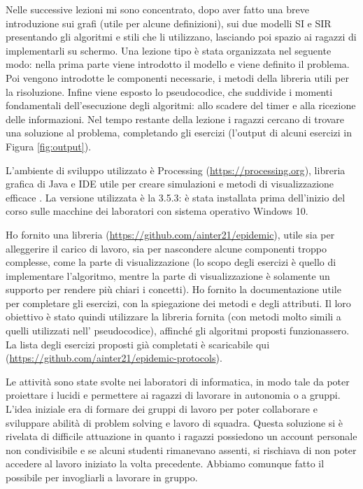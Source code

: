 Nelle successive lezioni mi sono concentrato, dopo aver fatto una breve introduzione sui grafi (utile per alcune definizioni), sui due modelli SI e SIR presentando gli algoritmi e stili che li utilizzano, lasciando poi spazio ai ragazzi di implementarli su schermo. Una lezione tipo è stata organizzata nel seguente modo: nella prima parte viene introdotto il modello e viene definito il problema. Poi vengono introdotte le componenti necessarie, i metodi della libreria utili per la risoluzione. Infine viene esposto lo pseudocodice, che suddivide i momenti fondamentali dell'esecuzione degli algoritmi: allo scadere del timer e alla ricezione delle informazioni. Nel tempo restante della lezione i ragazzi cercano di trovare una soluzione al problema, completando gli esercizi (l'output di alcuni esercizi in Figura \ref{fig:output}).

L’ambiente di sviluppo utilizzato è Processing (\href{https://processing.org}{https://processing.org}), libreria grafica di Java e IDE utile per creare simulazioni e metodi di visualizzazione efficace \cite{processing_wikipedia}. La versione utilizzata è la 3.5.3: è stata installata prima dell'inizio del corso sulle macchine dei laboratori con sistema operativo Windows 10.

Ho fornito una libreria (\href{https://github.com/ainter21/epidemic}{https://github.com/ainter21/epidemic}), utile sia per alleggerire il carico di lavoro, sia per nascondere alcune componenti troppo complesse, come la parte di visualizzazione (lo scopo degli esercizi è quello di implementare l’algoritmo, mentre la parte di visualizzazione è solamente un supporto per rendere più chiari i concetti).
Ho fornito la documentazione utile per completare gli esercizi, con la spiegazione dei metodi e degli attributi. Il loro obiettivo è stato quindi utilizzare la libreria fornita (con metodi molto simili a quelli utilizzati nell' pseudocodice), affinché gli algoritmi proposti funzionassero. La lista degli esercizi proposti già completati è scaricabile qui (\href{https://github.com/ainter21/epidemic-protocols}{https://github.com/ainter21/epidemic-protocols}).

Le attività sono state svolte nei laboratori di informatica, in modo tale da poter proiettare i lucidi e permettere ai ragazzi di lavorare in autonomia o a gruppi. L'idea iniziale era di formare dei gruppi di lavoro per poter collaborare e sviluppare abilità di problem solving e lavoro di squadra. Questa soluzione si è rivelata di difficile attuazione in quanto i ragazzi possiedono un account personale non condivisibile e se alcuni studenti rimanevano assenti, si rischiava di non poter accedere al lavoro iniziato la volta precedente. Abbiamo comunque fatto il possibile per invogliarli a lavorare in gruppo.

